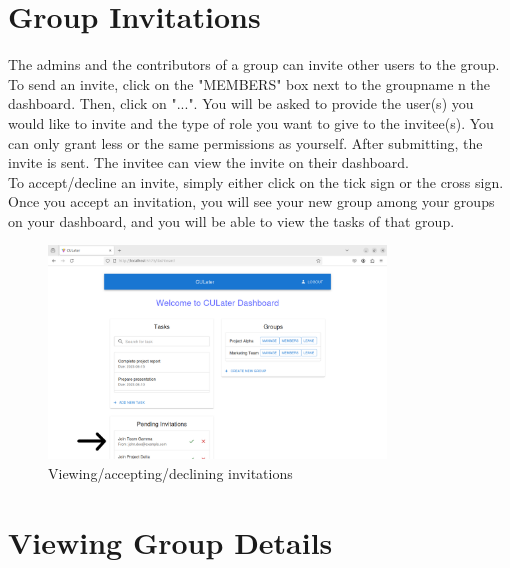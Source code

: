 \documentclass{scrreprt}
\begin{document}
\chapter{Group Invitations}

The admins and the contributors of a group can invite other users to the group. To send an invite, click on the "MEMBERS" box next to the groupname n the dashboard. Then, click on "...". You will be asked to provide the user(s) you would like to invite and the type of role you want to give to the invitee(s). You can only grant less or the same permissions as yourself. After submitting, the invite is sent. The invitee can view the invite on their dashboard.\\

To accept/decline an invite, simply either click on the tick sign or the cross sign. Once you accept an invitation, you will see your new group among your groups on your dashboard, and you will be able to view the tasks of that group.\\
\begin{figure}[htbp]
        \centering
        \includegraphics[width=0.8\textwidth]{invitation.png}
	\caption{Viewing/accepting/declining invitations}
	\label{fig:my_label}
\end{figure}


\chapter{Viewing Group Details}
\end{document}
